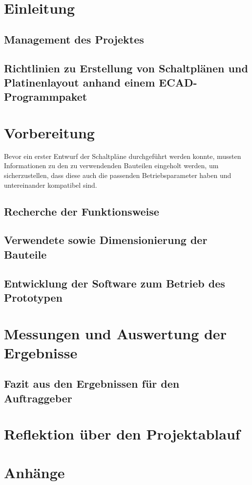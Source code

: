 \documentclass [11pt,a4paper,bibliography=totoc]{scrreprt}%
\begin{document}
\thispagestyle{empty}

\newpage
\thispagestyle{empty}

\setcounter{page}{0}
\newpage 
{} 
\tableofcontents 
\newpage
\newpage
\setcounter{page}{0}

\chapter{Einleitung}


\section{Management des Projektes}

\section{Richtlinien zu Erstellung von Schaltplänen und Platinenlayout anhand einem ECAD-Programmpaket}



\chapter{Vorbereitung}
Bevor ein erster Entwurf der Schaltpläne durchgeführt werden konnte, mussten Informationen zu den zu verwendenden Bauteilen eingeholt werden, um sicherzustellen, dass diese auch die passenden Betriebsparameter haben und untereinander kompatibel sind.
\section{Recherche der Funktionsweise}

\section{Verwendete sowie Dimensionierung der Bauteile}

\section{Entwicklung der Software zum Betrieb des Prototypen}


\chapter{Messungen und Auswertung der Ergebnisse}
\label{Messungen}

\section{Fazit aus den Ergebnissen für den Auftraggeber}

\chapter{Reflektion über den Projektablauf}

\chapter{Anhänge}


\listoffigures
\listoftables
\end{document}
